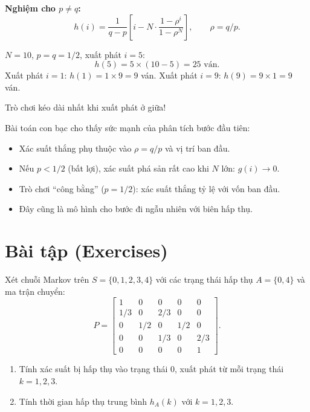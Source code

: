 \textbf{Nghiệm cho $p \neq q$:}
\begin{equation}\label{eq:gambler-time-biased}
  h(i) = \frac{1}{q - p}\left[i - N \cdot \frac{1 - \rho^i}{1 - \rho^N}\right], \qquad \rho = q/p.
\end{equation}

\begin{example}
$N = 10$, $p = q = 1/2$, xuất phát $i = 5$:
\[
  h(5) = 5 \times (10 - 5) = 25 \text{ ván}.
\]
Xuất phát $i = 1$: $h(1) = 1 \times 9 = 9$ ván.
Xuất phát $i = 9$: $h(9) = 9 \times 1 = 9$ ván.

Trò chơi kéo dài nhất khi xuất phát ở giữa!
\end{example}

\begin{tomtat}
Bài toán con bạc cho thấy sức mạnh của phân tích bước đầu tiên:
\begin{itemize}[nosep]
  \item Xác suất thắng phụ thuộc vào $\rho = q/p$ và vị trí ban đầu.
  \item Nếu $p < 1/2$ (bất lợi), xác suất phá sản rất cao khi $N$ lớn: $g(i) \to 0$.
  \item Trò chơi ``công bằng'' ($p = 1/2$): xác suất thắng tỷ lệ với vốn ban đầu.
  \item Đây cũng là mô hình cho bước đi ngẫu nhiên với biên hấp thụ.
\end{itemize}
\end{tomtat}

\section{Bài tập (Exercises)}
\label{sec:ch5-exercises}

\begin{exercise}
Xét chuỗi Markov trên $S = \{0, 1, 2, 3, 4\}$ với các trạng thái hấp thụ $A = \{0, 4\}$
và ma trận chuyển:
\[
  P = \begin{bmatrix}
    1 & 0 & 0 & 0 & 0\\
    1/3 & 0 & 2/3 & 0 & 0\\
    0 & 1/2 & 0 & 1/2 & 0\\
    0 & 0 & 1/3 & 0 & 2/3\\
    0 & 0 & 0 & 0 & 1
  \end{bmatrix}.
\]
\begin{enumerate}[label=(\alph*)]
  \item Tính xác suất bị hấp thụ vào trạng thái $0$, xuất phát từ mỗi trạng thái $k = 1, 2, 3$.
  \item Tính thời gian hấp thụ trung bình $h_A(k)$ với $k = 1, 2, 3$.
\end{enumerate}
\end{exercise}

